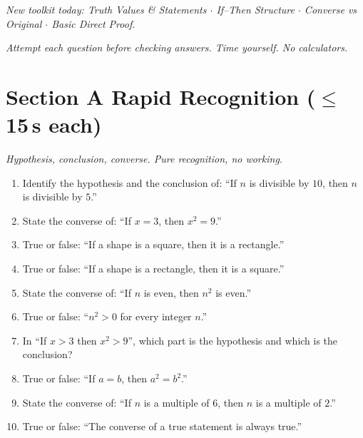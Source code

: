\documentclass[11pt,a4paper]{article}
\begin{document}
\noindent\textit{New toolkit today: Truth Values \& Statements $\cdot$ If--Then Structure $\cdot$ Converse vs Original $\cdot$ Basic Direct Proof.}

\vspace{2pt}
\noindent\textit{Attempt each question before checking answers. Time yourself. No calculators.}

\section*{Section A \quad Rapid Recognition \hfill{\normalfont\small($\leq$15\,s each)}}

\noindent\textit{Hypothesis, conclusion, converse. Pure recognition, no working.}

\begin{enumerate}

\item Identify the hypothesis and the conclusion of: ``If $n$ is divisible by $10$, then $n$ is divisible by $5$.''

\item State the converse of: ``If $x = 3$, then $x^2 = 9$.''

\item True or false: ``If a shape is a square, then it is a rectangle.''

\item True or false: ``If a shape is a rectangle, then it is a square.''

\item State the converse of: ``If $n$ is even, then $n^2$ is even.''

\item True or false: ``$n^2 > 0$ for every integer $n$.''

\item In ``If $x>3$ then $x^2 > 9$'', which part is the hypothesis and which is the conclusion?

\item True or false: ``If $a=b$, then $a^2 = b^2$.''

\item State the converse of: ``If $n$ is a multiple of $6$, then $n$ is a multiple of $2$.''

\item True or false: ``The converse of a true statement is always true.''

\end{enumerate}
\end{document}
